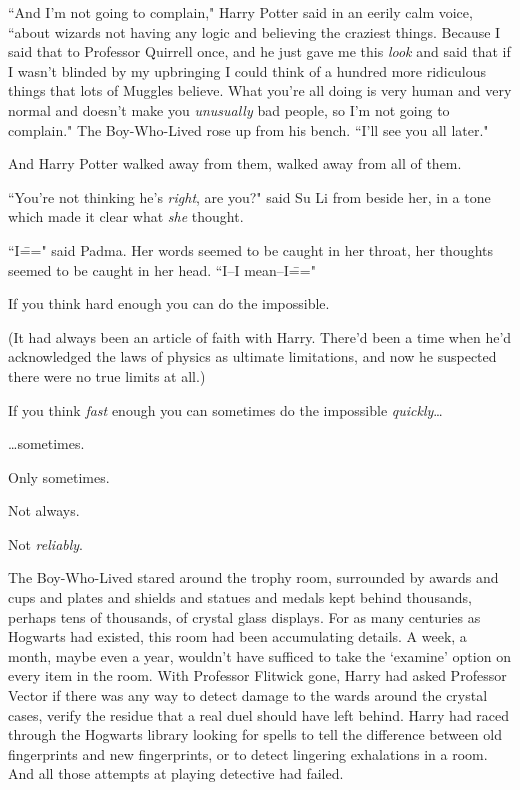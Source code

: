 ``And I'm not going to complain," Harry Potter said in an eerily calm voice, ``about wizards not having any logic and believing the craziest things. Because I said that to Professor Quirrell once, and he just gave me this \emph{look} and said that if I wasn't blinded by my upbringing I could think of a hundred more ridiculous things that lots of Muggles believe. What you're all doing is very human and very normal and doesn't make you \emph{unusually} bad people, so I'm not going to complain." The Boy-Who-Lived rose up from his bench. ``I'll see you all later."

And Harry Potter walked away from them, walked away from all of them.

``You're not thinking he's \emph{right}, are you?" said Su Li from beside her, in a tone which made it clear what \emph{she} thought.

``I\===" said Padma. Her words seemed to be caught in her throat, her thoughts seemed to be caught in her head. ``I\---I mean\---I\==="

\later

If you think hard enough you can do the impossible.

(It had always been an article of faith with Harry. There'd been a time when he'd acknowledged the laws of physics as ultimate limitations, and now he suspected there were no true limits at all.)

If you think \emph{fast} enough you can sometimes do the impossible \emph{quickly}{\ldots}

{\ldots}sometimes.

Only sometimes.

Not always.

Not \emph{reliably}.

The Boy-Who-Lived stared around the trophy room, surrounded by awards and cups and plates and shields and statues and medals kept behind thousands, perhaps tens of thousands, of crystal glass displays. For as many centuries as Hogwarts had existed, this room had been accumulating details. A week, a month, maybe even a year, wouldn't have sufficed to take the `examine' option on every item in the room. With Professor Flitwick gone, Harry had asked Professor Vector if there was any way to detect damage to the wards around the crystal cases, verify the residue that a real duel should have left behind. Harry had raced through the Hogwarts library looking for spells to tell the difference between old fingerprints and new fingerprints, or to detect lingering exhalations in a room. And all those attempts at playing detective had failed.

